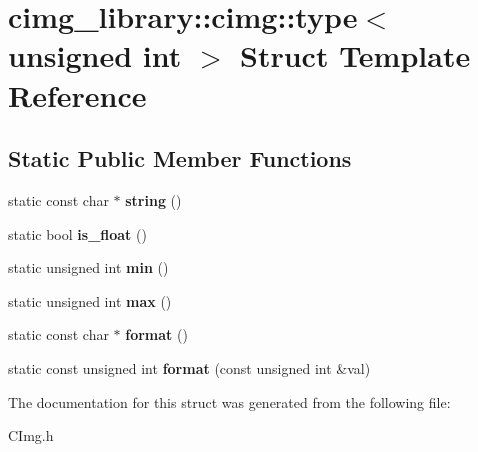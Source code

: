 \hypertarget{structcimg__library_1_1cimg_1_1type_3_01unsigned_01int_01_4}{\section{cimg\-\_\-library\-:\-:cimg\-:\-:type$<$ unsigned int $>$ Struct Template Reference}
\label{structcimg__library_1_1cimg_1_1type_3_01unsigned_01int_01_4}
}
\subsection*{Static Public Member Functions}
\begin{DoxyCompactItemize}
\item 
\hypertarget{structcimg__library_1_1cimg_1_1type_3_01unsigned_01int_01_4_a087694c51eacd6147686f878e0565968}{static const char $\ast$ {\bfseries string} ()}\label{structcimg__library_1_1cimg_1_1type_3_01unsigned_01int_01_4_a087694c51eacd6147686f878e0565968}

\item 
\hypertarget{structcimg__library_1_1cimg_1_1type_3_01unsigned_01int_01_4_aebebd8c49b3c82f7b1661893179cb1db}{static bool {\bfseries is\-\_\-float} ()}\label{structcimg__library_1_1cimg_1_1type_3_01unsigned_01int_01_4_aebebd8c49b3c82f7b1661893179cb1db}

\item 
\hypertarget{structcimg__library_1_1cimg_1_1type_3_01unsigned_01int_01_4_ade83ed13ea846f7f2303a3eb668e4e7c}{static unsigned int {\bfseries min} ()}\label{structcimg__library_1_1cimg_1_1type_3_01unsigned_01int_01_4_ade83ed13ea846f7f2303a3eb668e4e7c}

\item 
\hypertarget{structcimg__library_1_1cimg_1_1type_3_01unsigned_01int_01_4_aabd62c9d0847db3de3a0fabfdcd9e10e}{static unsigned int {\bfseries max} ()}\label{structcimg__library_1_1cimg_1_1type_3_01unsigned_01int_01_4_aabd62c9d0847db3de3a0fabfdcd9e10e}

\item 
\hypertarget{structcimg__library_1_1cimg_1_1type_3_01unsigned_01int_01_4_ad8508bd67b093d7c7d5d8b7eaa6c3752}{static const char $\ast$ {\bfseries format} ()}\label{structcimg__library_1_1cimg_1_1type_3_01unsigned_01int_01_4_ad8508bd67b093d7c7d5d8b7eaa6c3752}

\item 
\hypertarget{structcimg__library_1_1cimg_1_1type_3_01unsigned_01int_01_4_a522c1a7b901088353fc15ee06fa7f354}{static const unsigned int {\bfseries format} (const unsigned int \&val)}\label{structcimg__library_1_1cimg_1_1type_3_01unsigned_01int_01_4_a522c1a7b901088353fc15ee06fa7f354}

\end{DoxyCompactItemize}


The documentation for this struct was generated from the following file\-:\begin{DoxyCompactItemize}
\item 
C\-Img.\-h\end{DoxyCompactItemize}
